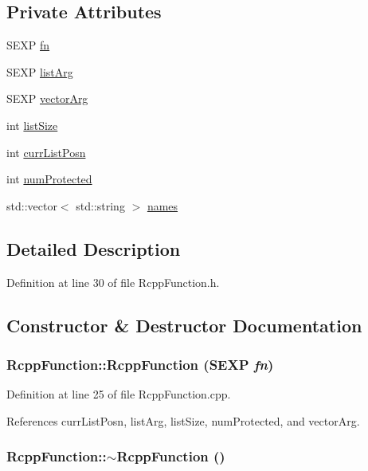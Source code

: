 \subsection*{Private Attributes}
\begin{DoxyCompactItemize}
\item 
SEXP \hyperlink{classRcppFunction_aa6b5966224b8b7d158be6cdfc3612063}{fn}
\item 
SEXP \hyperlink{classRcppFunction_a3b8a2c8441c9791f9fe5bd5273bbceec}{listArg}
\item 
SEXP \hyperlink{classRcppFunction_a0492c128c0f72cda44e679265b36b50e}{vectorArg}
\item 
int \hyperlink{classRcppFunction_ac3a42478ffd123f430ba3e09099db6f8}{listSize}
\item 
int \hyperlink{classRcppFunction_ace513a92e96b36883b709b5352ea5663}{currListPosn}
\item 
int \hyperlink{classRcppFunction_adc777e7d1628ccc4f531a8375f30f385}{numProtected}
\item 
std::vector$<$ std::string $>$ \hyperlink{classRcppFunction_abf9e86df5e1a290a5f321e6051f0d2b2}{names}
\end{DoxyCompactItemize}


\subsection{Detailed Description}


Definition at line 30 of file RcppFunction.h.

\subsection{Constructor \& Destructor Documentation}
\hypertarget{classRcppFunction_a6fc6fca8d052170d86240c784f54261a}{
\subsubsection[{RcppFunction}]{\setlength{\rightskip}{0pt plus 5cm}RcppFunction::RcppFunction (SEXP {\em fn})}}
\label{classRcppFunction_a6fc6fca8d052170d86240c784f54261a}


Definition at line 25 of file RcppFunction.cpp.

References currListPosn, listArg, listSize, numProtected, and vectorArg.\hypertarget{classRcppFunction_ae155cf5dd33cb110e9a89a59c7bff6e9}{
\subsubsection[{$\sim$RcppFunction}]{\setlength{\rightskip}{0pt plus 5cm}RcppFunction::$\sim$RcppFunction ()}}
\label{classRcppFunction_ae155cf5dd33cb110e9a89a59c7bff6e9}



